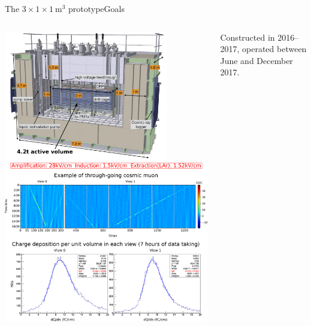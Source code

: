 \documentclass[10pt]{beamer}
\begin{document}
    \begin{frame}{The \texorpdfstring{$3 \times 1 \times \SI{1}{\meter\cubed}$}{311} prototype}{Goals}
    	\begin{scriptsize}
    		\vfill
    		\begin{columns}
    			\begin{column}{0.48\textwidth}
    				\centering
    				\includegraphics[width=0.8\textwidth]{figures/311/311_2.png}\\
    				\includegraphics[width=\textwidth]{figures/311/run840.png}
    			\end{column}\hfill
    			\begin{column}{0.48\textwidth}
    				Constructed in 2016--2017, operated between June and December 2017.\\
    				\vspace{0.3cm}

\end{column}
\end{columns}
\end{scriptsize}
\end{frame}
\end{document}
